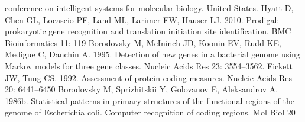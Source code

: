 \documentclass[14pt]{extarticle}
\begin{document}
\begin{thebibliography}{9}
    conference on intelligent systems for molecular biology. United States. 
      Hyatt D, Chen GL, Locascio PF, Land ML, Larimer FW, Hauser LJ. 2010. Prodigal: prokaryotic gene 
    recognition and translation initiation site identification. BMC Bioinformatics 11: 119
      Borodovsky M, McIninch JD, Koonin EV, Rudd KE, Medigue C, Danchin A. 1995. Detection of new genes
    in a bacterial genome using Markov models for three gene classes. Nucleic Acids Res 23: 3554–3562.
     Fickett JW, Tung CS. 1992. Assessment of protein coding measures. Nucleic Acids Res 20: 6441–6450
     Borodovsky M, Sprizhitskii Y, Golovanov E, Aleksandrov A. 1986b. Statistical patterns in primary 
    structures of the functional regions of the genome of Escherichia coli. Computer recognition of coding regions. Mol 
    Biol 20
    
\end{thebibliography}
\end{document}
